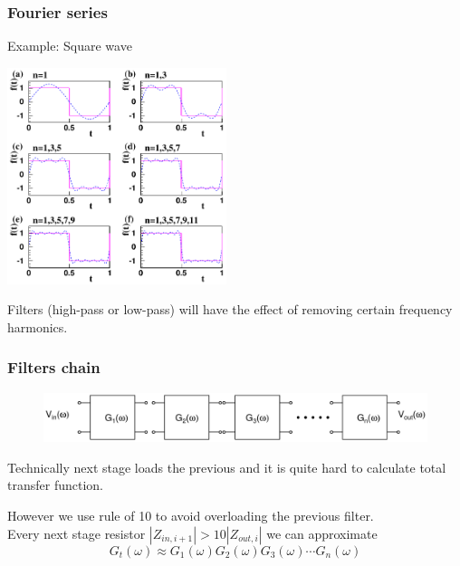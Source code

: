 \documentclass[beamer]{standalone}
\begin{document}
\begin{frame}[t]
 \frametitle{Fourier series}
 \begin{block}{Example: Square wave}
  \begin{center}
   \includegraphics[width=0.48\textwidth]{pics/square_wave_approximation}
  \end{center}
  Filters (high-pass or low-pass) will have the effect of removing certain frequency harmonics.
 \end{block}
\end{frame}

\begin{frame}
 \frametitle{Filters chain}
 \begin{figure}
  \includegraphics[angle=0,width=1.0\textwidth]{./circuits/black_box_transfer_in_freq_chain.pdf}
 \end{figure}
 Technically next stage loads the previous and it is quite hard to
 calculate total transfer function.

 However we use rule of 10 to avoid overloading the previous filter.\\
 Every next stage resistor $|Z_{in,i+1}| > 10 |Z_{out,i}|$ we can approximate
 \[
 G_t(\omega) \approx G_1(\omega) G_2(\omega) G_3(\omega) \cdots G_n(\omega)
 \]
\end{frame}
\end{document}
